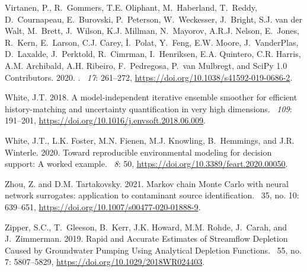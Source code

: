 \documentclass[12pt, oneside]{article}  	%
\begin{document}
\begin{thebibliography}{}
Virtanen, P., R.~Gommers, T.E. Oliphant, M.~Haberland, T.~Reddy, D.~Cournapeau,
  E.~Burovski, P.~Peterson, W.~Weckesser, J.~Bright, S.J. {van der Walt},
  M.~Brett, J.~Wilson, K.J. Millman, N.~Mayorov, A.R.J. Nelson, E.~Jones,
  R.~Kern, E.~Larson, C.J. Carey, {\.I}.~Polat, Y.~Feng, E.W. Moore,
  J.~{VanderPlas}, D.~Laxalde, J.~Perktold, R.~Cimrman, I.~Henriksen, E.A.
  Quintero, C.R. Harris, A.M. Archibald, A.H. Ribeiro, F.~Pedregosa, P.~{van
  Mulbregt}, and {SciPy 1.0 Contributors}. 2020.
.
~{\em 17}: 261--272,
  \url{https://doi.org/10.1038/s41592-019-0686-2}.

White, J.T. 2018.
\newblock A model-independent iterative ensemble smoother for efficient
  history-matching and uncertainty quantification in very high dimensions.
~{\em 109}: 191--201,
  \url{https://doi.org/10.1016/j.envsoft.2018.06.009}.

White, J.T., L.K. Foster, M.N. Fienen, M.J. Knowling, B.~Hemmings, and J.R.
  Winterle. 2020.
\newblock Toward reproducible environmental modeling for decision support: A
  worked example.
~{\em 8}: 50,
  \url{https://doi.org/10.3389/feart.2020.00050}.

Zhou, Z. and D.M. Tartakovsky. 2021.
\newblock Markov chain Monte Carlo with neural network surrogates: application
  to contaminant source identification.
~35, no.
  10: 639--651, \url{https://doi.org/10.1007/s00477-020-01888-9}.

Zipper, S.C., T.~Gleeson, B.~Kerr, J.K. Howard, M.M. Rohde, J.~Carah, and
  J.~Zimmerman. 2019.
\newblock Rapid and Accurate Estimates of Streamflow Depletion Caused by
  Groundwater Pumping Using Analytical Depletion Functions.
~55, no. 7: 5807--5829,
  \url{https://doi.org/10.1029/2018WR024403}.

\end{thebibliography}

\begingroup
	\renewcommand{\listfigurename}{Figure captions}
	\listoffigures
\endgroup
\end{document}
